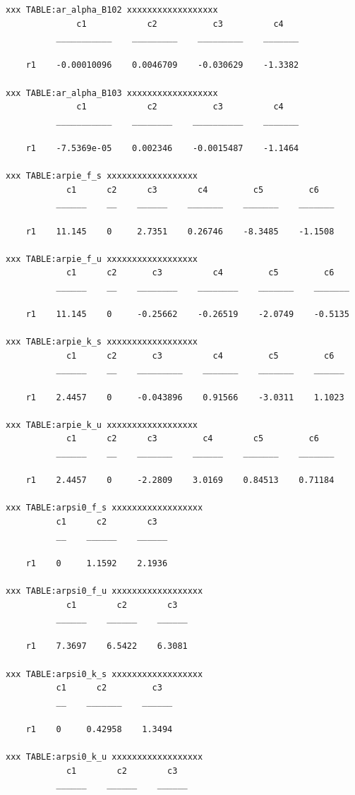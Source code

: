 \documentclass[
]{book}
\begin{document}
\begin{verbatim}
xxx TABLE:ar_alpha_B102 xxxxxxxxxxxxxxxxxx
              c1            c2           c3          c4   
          ___________    _________    _________    _______

    r1    -0.00010096    0.0046709    -0.030629    -1.3382

xxx TABLE:ar_alpha_B103 xxxxxxxxxxxxxxxxxx
              c1            c2           c3          c4   
          ___________    ________    __________    _______

    r1    -7.5369e-05    0.002346    -0.0015487    -1.1464

xxx TABLE:arpie_f_s xxxxxxxxxxxxxxxxxx
            c1      c2      c3        c4         c5         c6   
          ______    __    ______    _______    _______    _______

    r1    11.145    0     2.7351    0.26746    -8.3485    -1.1508

xxx TABLE:arpie_f_u xxxxxxxxxxxxxxxxxx
            c1      c2       c3          c4         c5         c6   
          ______    __    ________    ________    _______    _______

    r1    11.145    0     -0.25662    -0.26519    -2.0749    -0.5135

xxx TABLE:arpie_k_s xxxxxxxxxxxxxxxxxx
            c1      c2       c3          c4         c5         c6  
          ______    __    _________    _______    _______    ______

    r1    2.4457    0     -0.043896    0.91566    -3.0311    1.1023

xxx TABLE:arpie_k_u xxxxxxxxxxxxxxxxxx
            c1      c2      c3         c4        c5         c6   
          ______    __    _______    ______    _______    _______

    r1    2.4457    0     -2.2809    3.0169    0.84513    0.71184

xxx TABLE:arpsi0_f_s xxxxxxxxxxxxxxxxxx
          c1      c2        c3  
          __    ______    ______

    r1    0     1.1592    2.1936

xxx TABLE:arpsi0_f_u xxxxxxxxxxxxxxxxxx
            c1        c2        c3  
          ______    ______    ______

    r1    7.3697    6.5422    6.3081

xxx TABLE:arpsi0_k_s xxxxxxxxxxxxxxxxxx
          c1      c2         c3  
          __    _______    ______

    r1    0     0.42958    1.3494

xxx TABLE:arpsi0_k_u xxxxxxxxxxxxxxxxxx
            c1        c2        c3  
          ______    ______    ______


\end{verbatim}
\end{document}
